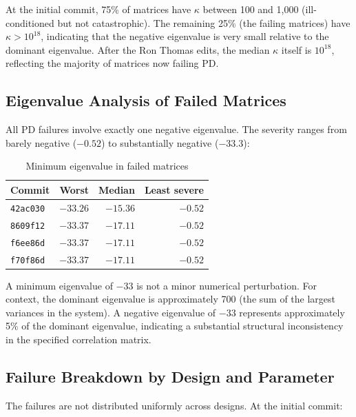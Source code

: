 \documentclass[11pt]{article}
\begin{document}
At the initial commit, 75\% of matrices have $\kappa$ between
100 and 1{,}000 (ill-conditioned but not catastrophic). The
remaining 25\% (the failing matrices) have $\kappa > 10^{18}$,
indicating that the negative eigenvalue is very small relative
to the dominant eigenvalue. After the Ron Thomas edits, the
median $\kappa$ itself is $10^{18}$, reflecting the majority
of matrices now failing PD.

\subsection{Eigenvalue Analysis of Failed Matrices}

All PD failures involve exactly one negative eigenvalue. The
severity ranges from barely negative ($-0.52$) to substantially
negative ($-33.3$):

\begin{table}[h]
\centering
\caption{Minimum eigenvalue in failed matrices}
\begin{tabular}{lrrr}
\toprule
Commit & Worst & Median & Least severe \\
\midrule
\texttt{42ac030} & $-33.26$ & $-15.36$ & $-0.52$ \\
\texttt{8609f12} & $-33.37$ & $-17.11$ & $-0.52$ \\
\texttt{f6ee86d} & $-33.37$ & $-17.11$ & $-0.52$ \\
\texttt{f70f86d} & $-33.37$ & $-17.11$ & $-0.52$ \\
\bottomrule
\end{tabular}
\end{table}

A minimum eigenvalue of $-33$ is not a minor numerical
perturbation. For context, the dominant eigenvalue is
approximately 700 (the sum of the largest variances in the
system). A negative eigenvalue of $-33$ represents approximately
5\% of the dominant eigenvalue, indicating a substantial
structural inconsistency in the specified correlation matrix.

\subsection{Failure Breakdown by Design and Parameter}

The failures are not distributed uniformly across designs. At
the initial commit:
\end{document}

